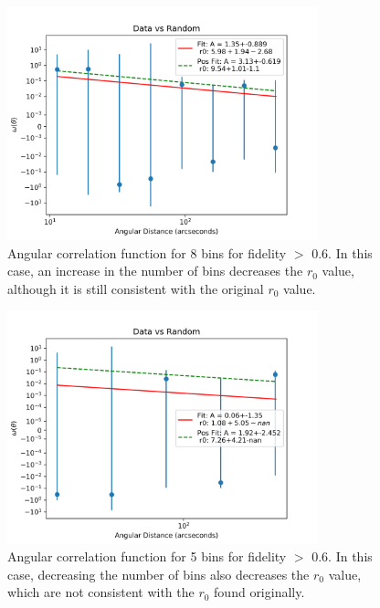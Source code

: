 \begin{figure}[!tbp]
\centering \includegraphics[width=90mm]{clustering_two/Data_vs_Random_10000_bin8_sn0_6_NFalse.png}
\caption{Angular correlation function for 8 bins  for fidelity $>$ 0.6. In this case, an increase in the number of bins decreases the $r_0$ value, although it is still consistent with the original $r_0$ value.}
\label{fig:Angular_bin_8}
\end{figure}

\begin{figure}[!tbp]
\centering \includegraphics[width=90mm]{clustering_two/Data_vs_Random_10000_bin5_sn0_6_NFalse.png}
\caption{Angular correlation function for 5 bins for fidelity $>$ 0.6. In this case, decreasing the number of bins also decreases the $r_0$ value, which are not consistent with the $r_0$ found originally.}
\label{fig:Angular_bin_5}
\end{figure}


